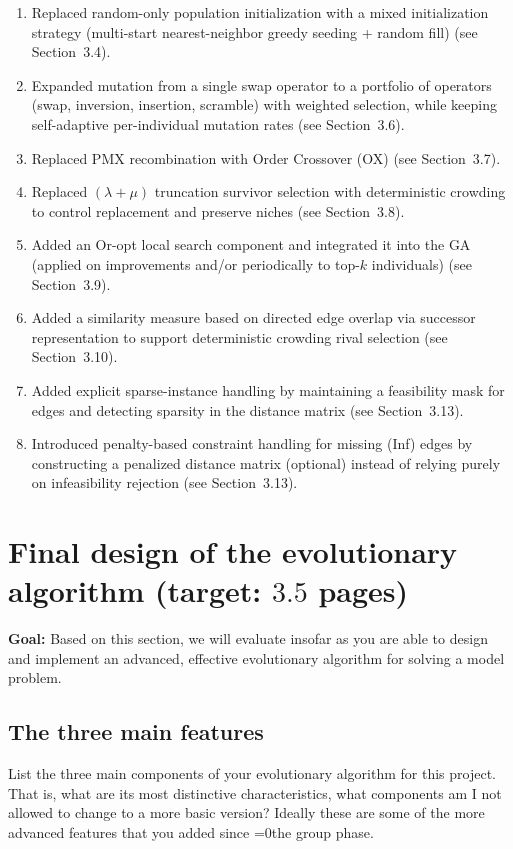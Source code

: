 \documentclass[a4paper,10pt]{article}
\def\retake{0}
\newcommand{\switch}[2]{\ifnum\retake=0{#1}\else{#2}\fi}
\newcommand{\ReplaceMe}[1]{{\color{blue}#1}}
\newcommand{\RemoveMe}[1]{{\color{purple}#1}}
\begin{document}
\begin{enumerate}
	\item Replaced random-only population initialization with a mixed initialization strategy (multi-start nearest-neighbor greedy seeding + random fill) (see Section~3.4).
	\item Expanded mutation from a single swap operator to a portfolio of operators (swap, inversion, insertion, scramble) with weighted selection, while keeping self-adaptive per-individual mutation rates (see Section~3.6).
	\item Replaced PMX recombination with Order Crossover (OX) (see Section~3.7).
	\item Replaced $(\lambda+\mu)$ truncation survivor selection with deterministic crowding to control replacement and preserve niches (see Section~3.8).
	\item Added an Or-opt local search component and integrated it into the GA (applied on improvements and/or periodically to top-$k$ individuals) (see Section~3.9).
	\item Added a similarity measure based on directed edge overlap via successor representation to support deterministic crowding rival selection (see Section~3.10).
	\item Added explicit sparse-instance handling by maintaining a feasibility mask for edges and detecting sparsity in the distance matrix (see Section~3.13).
	\item Introduced penalty-based constraint handling for missing (Inf) edges by constructing a penalized distance matrix (optional) instead of relying purely on infeasibility rejection (see Section~3.13).
\end{enumerate}


\section{Final design of the evolutionary algorithm \hfill(target: $3.5$ pages)} 

\RemoveMe{\textbf{Goal:} Based on this section, we will evaluate insofar as you are able to design and implement an advanced, effective evolutionary algorithm for solving a model problem.}


\subsection{The three main features}
\ReplaceMe{List the three main components of your evolutionary algorithm for this project. That is, what are its most distinctive characteristics, what components am I not allowed to change to a more basic version? Ideally these are some of the more advanced features that you added since \switch{the group phase}{your previous submission}.}
\end{document}
